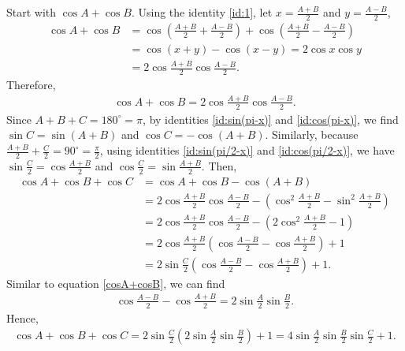 \begin{solution}
Start with $\cos A + \cos B$. Using the identity \eqref{id:1}, let $x= \frac{A+B}{2}$ and $y = \frac{A-B}{2}$,
    \begin{align*}
        \cos A + \cos B &= \cos \left(\frac{A+B}{2} + \frac{A-B}{2}\right) + \cos \left(\frac{A+B}{2} - \frac{A-B}{2}\right)\\
        &=\cos(x+y) - \cos(x-y) =2 \cos x \cos y\\
        &= 2 \cos{\frac{A + B}{2}} \cos{\frac{A - B}{2}}.
    \end{align*}
Therefore,
    \begin{align}
        \cos A + \cos B = 2 \cos{\frac{A + B}{2}} \cos{\frac{A - B}{2}}. \label{cosA+cosB}
    \end{align}
Since $A + B + C = 180^\circ = \pi$, by identities \eqref{id:sin(pi-x)} and \eqref{id:cos(pi-x)}, we find $\sin C = \sin{(A + B)}$ and $\cos C = -\cos{(A + B)}$. Similarly, because $\frac{A+B}{2} + \frac{C}{2} = 90^\circ = \frac{\pi}{2}$, using identities \eqref{id:sin(pi/2-x)} and \eqref{id:cos(pi/2-x)}, we have $\sin{\frac C 2} = \cos{\frac{A + B}{2}}$ and $\cos{\frac C 2} = \sin{\frac{A + B}{2}}$. Then,
\begin{align*}
    \cos A + \cos B + \cos C &= \cos A + \cos B - \cos{(A + B)} \\
    &= 2 \cos{\frac{A + B}{2}} \cos{\frac{A - B}{2}} - \left( \cos^2{\frac{A + B}{2}} - \sin^2{\frac{A + B}{2}} \right) \\
    &= 2 \cos{\frac{A + B}{2}} \cos{\frac{A - B}{2}} - \left( 2 \cos^2{\frac{A + B}{2}} - 1 \right) \\
    &=2 \cos{\frac{A + B}{2}} \left( \cos{\frac{A - B}{2}} - \cos{\frac{A + B}{2}} \right) + 1\\
    &= 2 \sin{\frac{C}{2}} \left( \cos{\frac{A - B}{2}} - \cos{\frac{A + B}{2}} \right) + 1.
\end{align*}
Similar to equation \eqref{cosA+cosB}, we can find
    \begin{align*}
        \cos{\frac{A - B}{2}} - \cos{\frac{A + B}{2}} = 2 \sin{\frac A 2} \sin{\frac B 2}.
    \end{align*}
Hence,
\begin{align*}
    \cos A + \cos B + \cos C = 2 \sin{\frac C 2} \left( 2 \sin{\frac A 2} \sin{\frac B 2} \right) + 1 =4 \sin{\frac A 2} \sin{\frac B 2} \sin{\frac C 2} + 1.
\end{align*}
\end{solution}

